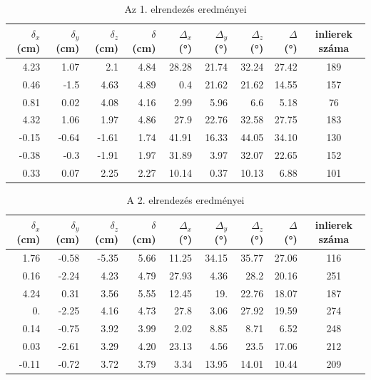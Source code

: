 
\setlength\tabcolsep{6pt}
\begin{table}[H]
\centering
\begin{tabular}{|rrr|r|rrr|r|c|}
\hline 
$\delta_x$ (cm) & $\delta_y$ (cm) & $\delta_z$ (cm) & $\delta$ (cm) & $\Delta_x$ (°) & $\Delta_y$ (°) & $\Delta_z$ (°) & $\Delta$ (°) & inlierek száma \\ \hline
 4.23&	1.07&	2.1&	4.84&	28.28&	21.74&	32.24&	27.42&	189\\
 0.46&	-1.5&	4.63&	4.89&	0.4&	21.62&	21.62&	14.55&	157\\
 0.81&	0.02&	4.08&	4.16&	2.99&	5.96&	6.6&	5.18&	76\\
 4.32&	1.06&	1.97&	4.86&	27.9&	22.76&	32.58&	27.75&	183\\
 -0.15&	-0.64&	-1.61&	1.74&	41.91&	16.33&	44.05&	34.10&	130\\
 -0.38&	-0.3&	-1.91&	1.97&	31.89&	3.97&	32.07&	22.65&	152\\
 0.33&	0.07&	2.25&	2.27&	10.14&	0.37&	10.13&	6.88&	101\\
\hline
\end{tabular}
\caption{Az 1. elrendezés eredményei}
\end{table}

\begin{table}[H]
\centering
\begin{tabular}{|rrr|r|rrr|r|c|}
\hline 
$\delta_x$ (cm) & $\delta_y$ (cm) & $\delta_z$ (cm) & $\delta$ (cm) & $\Delta_x$ (°) & $\Delta_y$ (°) & $\Delta_z$ (°) & $\Delta$ (°) & inlierek száma \\ \hline
 1.76&	-0.58&	-5.35&	5.66&	11.25&	34.15&	35.77&	27.06&	116\\
 0.16&	-2.24&	4.23&	4.79&	27.93&	4.36&	28.2&	20.16&	251\\
 4.24&	0.31&	3.56&	5.55&	12.45&	19.&	22.76&	18.07&	187\\
 0.&	-2.25&	4.16&	4.73&	27.8&	3.06&	27.92&	19.59&	274\\
 0.14&	-0.75&	3.92&	3.99&	2.02&	8.85&	8.71&	6.52&	248\\
 0.03&	-2.61&	3.29&	4.20&	23.13&	4.56&	23.5&	17.06&	212\\
 -0.11&	-0.72&	3.72&	3.79&	3.34&	13.95&	14.01&	10.44&	209\\
\hline
\end{tabular}
\caption{A 2. elrendezés eredményei}
\end{table}

